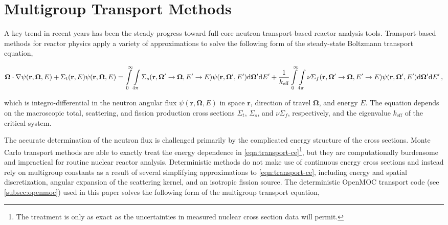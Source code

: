\section{Multigroup Transport Methods}
\label{sec:mg-theory}

A key trend in recent years has been the steady progress toward full-core neutron transport-based reactor analysis tools. Transport-based methods for reactor physics apply a variety of approximations to solve the following form of the steady-state Boltzmann transport equation,

\begin{dmath}
\label{eqn:transport-ce}
\mathbf{\Omega} \cdot \nabla \psi(\mathbf{r},\mathbf{\Omega},E) + \Sigma_{t}(\mathbf{r},E)\psi(\mathbf{r},\mathbf{\Omega},E) = \int\displaylimits_{0}^{\infty}\int\displaylimits_{4\pi} \Sigma_{s}(\mathbf{r},{\mathbf{\Omega'}\rightarrow\mathbf{\Omega}},{E'\rightarrow E}) \psi(\mathbf{r},\mathbf{\Omega'},E') \mathrm{d}\mathbf{\Omega'} \mathrm{d}E' + \frac{1}{k_{\textrm{eff}}}\int\displaylimits_{0}^{\infty}\int\displaylimits_{4\pi} \nu\Sigma_{f}(\mathbf{r},{\mathbf{\Omega'}\rightarrow \mathbf{\Omega}},{E'\rightarrow E})\psi(\mathbf{r},\mathbf{\Omega'},E') \mathrm{d}\mathbf{\Omega'} \mathrm{d}E'\,,
\end{dmath}

\noindent which is integro-differential in the neutron angular flux $\psi(\mathbf{r},\mathbf{\Omega},E)$ in space $\mathbf{r}$, direction of travel $\mathbf{\Omega}$, and energy $E$. The equation depends on the macroscopic total, scattering, and fission production cross sections $\Sigma_{t}$, $\Sigma_{s}$, and $\nu\Sigma_{f}$, respectively, and the eigenvalue $k_{\textrm{eff}}$ of the critical system.

The accurate determination of the neutron flux is challenged primarily by the complicated energy structure of the cross sections. Monte Carlo transport methods are able to exactly treat the energy dependence in \cref{eqn:transport-ce}\footnote{The treatment is only as exact as the uncertainties in measured nuclear cross section data will permit.}, but they are computationally burdensome and impractical for routine nuclear reactor analysis. Deterministic methods do not make use of continuous energy cross sections and instead rely on multigroup constants as a result of several simplifying approximations to \cref{eqn:transport-ce}, including energy and spatial discretization, angular expansion of the scattering kernel, and an isotropic fission source. The deterministic OpenMOC transport code (see \cref{subsec:openmoc}) used in this paper solves the following form of the multigroup transport equation,

